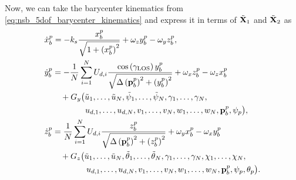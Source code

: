 Now, we can take the barycenter kinematics from \eqref{eq:nsb_5dof_barycenter_kinematics} and express it in terms of $\tilde{\mathbf{X}}_1$ and $\tilde{\mathbf{X}}_2$ as
\begin{subequations}
    \begin{align}
        &\dot{x}_b^p = -k_{s}\frac{x_b^p}{\sqrt{1+\left(x_b^p\right)^2}} + \omega_zy_b^p - \omega_yz_b^p, \label{eq:nsb_5dof_x_pb_CL} \\
        &\begin{aligned}
            \dot{y}_b^p &= - \frac{1}{N}\sum_{i=1}^N U_{d,i}{\frac{\cos\left(\gamma_{\rm LOS}\right)y_b^p}{\sqrt{\Delta\left(\mathbf{p}_b^p\right)^2 + \left(y_b^p\right)^2}}} + \omega_xz_b^p - \omega_zx_b^p \\
            & \quad + G_y\big(\tilde{u}_1, \ldots, \tilde{u}_N, \tilde{\psi}_1, \ldots, \tilde{\psi}_N, \gamma_1, \ldots, \gamma_N, \\
            & \qquad\qquad u_{d,1}, \ldots, u_{d,N}, v_1, \ldots, v_N, w_1, \ldots, w_N, \mathbf{p}_b^p, \psi_p\big),
        \end{aligned} \\
        &\begin{aligned}
            \dot{z}_b^p &= \frac{1}{N} \sum_{i=1}^N U_{d,i}\frac{z_b^p}{\sqrt{\Delta\left(\mathbf{p}_b^p\right)^2 + \left(z_b^p\right)^2}} + \omega_yx_b^p - \omega_xy_b^p \\
            & \quad + G_z\big(\tilde{u}_1, \ldots, \tilde{u}_N, \tilde{\theta}_1, \ldots, \tilde{\theta}_N, \gamma_1, \ldots, \gamma_N, \chi_1, \ldots, \chi_N, \\
            & \qquad \qquad\, u_{d,1}, \ldots, u_{d,N}, v_1, \ldots, v_N, w_1, \ldots, w_N, \mathbf{p}_b^p, \psi_p, \theta_p\big).
        \end{aligned} \label{eq:nsb_5dof_z_pb_CL}
    \end{align} \label{eq:nsb_5dof_nominal}
\end{subequations}

